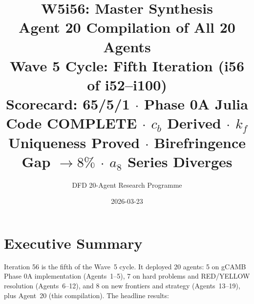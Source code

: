 \documentclass[11pt,a4paper]{article}
\title{\Huge W5i56: Master Synthesis\\[12pt]
\Large Agent 20 Compilation of All 20 Agents\\[6pt]
\large Wave 5 Cycle: Fifth Iteration (i56 of i52--i100)\\[6pt]
\normalsize Scorecard: 65/5/1 $\cdot$ Phase 0A Julia Code COMPLETE $\cdot$ $c_b$ Derived $\cdot$ $k_f$ Uniqueness Proved $\cdot$ Birefringence Gap $\to 8\%$ $\cdot$ $a_8$ Series Diverges}
\author{DFD 20-Agent Research Programme}
\date{2026-03-23}
\begin{document}
\maketitle


\section{Executive Summary}

Iteration 56 is the fifth of the Wave~5 cycle. It deployed 20 agents: 5 on gCAMB Phase 0A implementation (Agents~1--5), 7 on hard problems and RED/YELLOW resolution (Agents~6--12), and 8 on new frontiers and strategy (Agents~13--19), plus Agent~20 (this compilation). The headline results:
\end{document}
